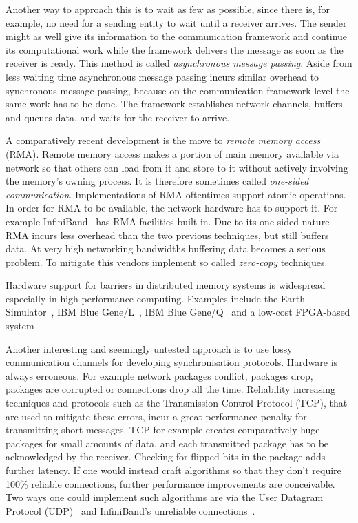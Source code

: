 \documentclass[a4paper, 10pt]{article}
\begin{document}
Another way to approach this is to wait as few as possible, since there is, for example, no need for a sending entity to wait until a receiver arrives. The sender might as well give its information to the communication framework and continue its computational work while the framework delivers the message as soon as the receiver is ready. This method is called \emph{asynchronous message passing}. Aside from less waiting time asynchronous message passing incurs similar overhead to synchronous message passing, because on the communication framework level the same work has to be done. The framework establishes network channels, buffers and queues data, and waits for the receiver to arrive.

A comparatively recent development is the move to \emph{remote memory access} (RMA). Remote memory access makes a portion of main memory available via network so that others can load from it and store to it without actively involving the memory's owning process. It is therefore sometimes called \emph{one-sided communication}. Implementations of RMA oftentimes support atomic operations.
In order for RMA to be available, the network hardware has to support it. For example InfiniBand~\cite{infiniband} has RMA facilities built in.
Due to its one-sided nature RMA incurs less overhead than the two previous techniques, but still buffers data. At very high networking bandwidths buffering data becomes a serious problem. To mitigate this vendors implement so called \emph{zero-copy} techniques.

Hardware support for barriers in distributed memory systems is widespread especially in high-performance computing. Examples include the Earth Simulator~\cite{earthsimulator}, IBM Blue Gene/L~\cite{bluegenel}, IBM Blue Gene/Q~\cite{bluegeneq} and a low-cost FPGA-based system~\cite{hoefler2006b}

Another interesting and seemingly untested approach is to use lossy communication channels for developing synchronisation protocols. Hardware is always erroneous. For example network packages conflict, packages drop, packages are corrupted or connections drop all the time. Reliability increasing techniques and protocols such as the Transmission Control Protocol (TCP), that are used to mitigate these errors, incur a great performance penalty for transmitting short messages. TCP for example creates comparatively huge packages for small amounts of data, and each transmitted package has to be acknowledged by the receiver. Checking for flipped bits in the package adds further latency.
If one would instead craft algorithms so that they don't require 100\% reliable connections, further performance improvements are conceivable.
Two ways one could implement such algorithms are via the User Datagram Protocol (UDP)~\cite{udp} and InfiniBand's unreliable connections~\cite{infiniband}.
\end{document}

